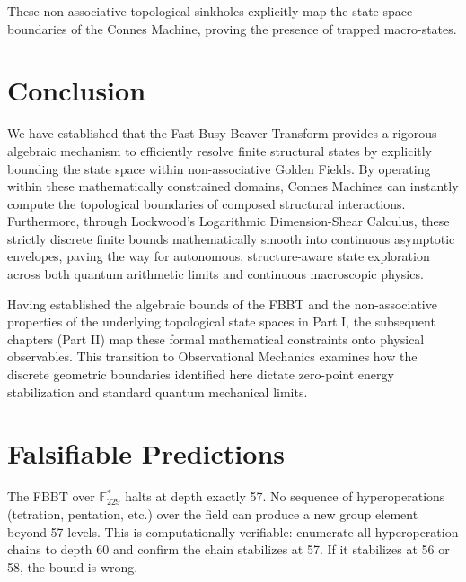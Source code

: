 These non-associative topological sinkholes explicitly map the state-space boundaries of the Connes Machine, proving the presence of trapped macro-states.

\section{Conclusion}

We have established that the Fast Busy Beaver Transform provides a rigorous algebraic mechanism to efficiently resolve finite structural states by explicitly bounding the state space within non-associative Golden Fields. By operating within these mathematically constrained domains, Connes Machines can instantly compute the topological boundaries of composed structural interactions. Furthermore, through Lockwood's Logarithmic Dimension-Shear Calculus, these strictly discrete finite bounds mathematically smooth into continuous asymptotic envelopes, paving the way for autonomous, structure-aware state exploration across both quantum arithmetic limits and continuous macroscopic physics.

\vspace{1em}
\noindent Having established the algebraic bounds of the FBBT and the non-associative properties of the underlying topological state spaces in Part I, the subsequent chapters (Part II) map these formal mathematical constraints onto physical observables. This transition to Observational Mechanics examines how the discrete geometric boundaries identified here dictate zero-point energy stabilization and standard quantum mechanical limits.

\section{Falsifiable Predictions}

\begin{hypothesis}\label{hyp:fbbt_depth}
The FBBT over $\mathbb{F}_{229}^*$ halts at depth exactly 57. No sequence of hyperoperations (tetration, pentation, etc.) over the field can produce a new group element beyond 57 levels. This is computationally verifiable: enumerate all hyperoperation chains to depth 60 and confirm the chain stabilizes at 57. If it stabilizes at 56 or 58, the bound is wrong.
\end{hypothesis}

